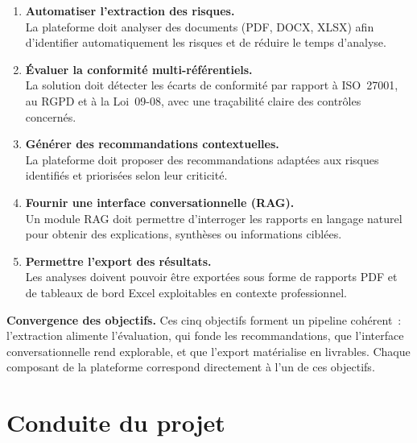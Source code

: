 \documentclass[a4paper,12pt,oneside]{report}
\begin{document}
	\begin{enumerate}[leftmargin=1.8em,itemsep=6pt]
		
		\item \textbf{Automatiser l'extraction des risques.}\\
		La plateforme doit analyser des documents (PDF, DOCX, XLSX) afin d'identifier automatiquement les risques et de r\'eduire le temps d'analyse.
		
		\item \textbf{\'Evaluer la conformit\'e multi-r\'ef\'erentiels.}\\
		La solution doit d\'etecter les \'ecarts de conformit\'e par rapport \`a ISO~27001, au RGPD et \`a la Loi~09-08, avec une tra\c{c}abilit\'e claire des contr\^oles concern\'es.
		
		\item \textbf{G\'en\'erer des recommandations contextuelles.}\\
		La plateforme doit proposer des recommandations adapt\'ees aux risques identifi\'es et prioris\'ees selon leur criticit\'e.
		
		\item \textbf{Fournir une interface conversationnelle (RAG).}\\
		Un module RAG doit permettre d'interroger les rapports en langage naturel pour obtenir des explications, synth\`eses ou informations cibl\'ees.
		
		\item \textbf{Permettre l'export des r\'esultats.}\\
		Les analyses doivent pouvoir \^etre export\'ees sous forme de rapports PDF et de tableaux de bord Excel exploitables en contexte professionnel.
		
	\end{enumerate}
	
	\begin{tcolorbox}[colback=darknavy!5,colframe=darknavy,arc=2pt,boxrule=0.6pt]
		\small\textbf{Convergence des objectifs.} Ces cinq objectifs forment un pipeline coh\'erent~: l'extraction alimente l'\'evaluation, qui fonde les recommandations, que l'interface conversationnelle rend explorable, et que l'export mat\'erialise en livrables. Chaque composant de la plateforme correspond directement \`a l'un de ces objectifs.
	\end{tcolorbox}
	
	\section{Conduite du projet}
	
\end{document}
